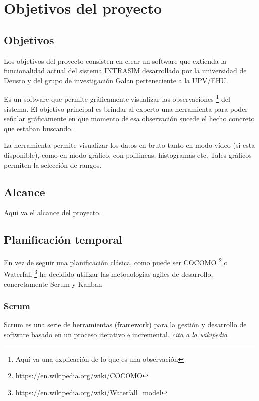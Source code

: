 \chapter{Objetivos del proyecto}


\section{Objetivos}
Los objetivos del proyecto consisten en crear un software que extienda la funcionalidad actual del sistema INTRASIM desarrollado por la universidad de Deusto y del grupo de investigación Galan perteneciente a la UPV/EHU.

Es un software que permite gráficamente visualizar las observaciones \footnote{Aquí va una explicación de lo que es una observación} del sistema. El objetivo principal es brindar al experto una herramienta para poder señalar gráficamente en que momento de esa observación sucede el hecho concreto que estaban buscando.

La herramienta permite visualizar los datos en bruto tanto en modo v\'{i}deo (si esta disponible), como en modo gr\'{a}fico, con polilineas, histogramas etc. Tales gráficos permiten la selección de rangos.

\section{Alcance}
Aquí va el alcance del proyecto.

\section{Planificaci\'{o}n temporal}
En vez de seguir una planificación clásica, como puede ser COCOMO \footnote{\url{https://en.wikipedia.org/wiki/COCOMO}} o Waterfall \footnote{\url{https://en.wikipedia.org/wiki/Waterfall_model}} he decidido utilizar las metodologías agiles de desarrollo, concretamente Scrum y Kanban

\subsection{Scrum}
Scrum es una serie de herramientas (framework) para la gestión y desarrollo de software basado en un proceso iterativo e incremental. \emph{cita a la wikipedia}


